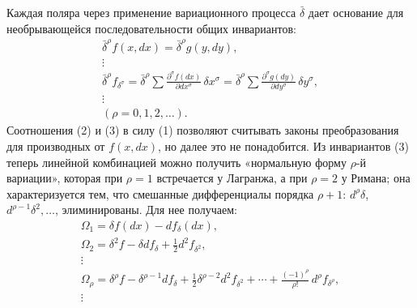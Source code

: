 \documentclass[11pt]{article}
\providecommand{\bdelta}{\bar{\delta}}
\begin{document}
Каждая поляра через применение вариационного процесса \(\bdelta\) дает основание для необрывающейся последовательности общих инвариантов:
\begin{equation}
\begin{gathered}
\bdelta^\rho f(x,dx)=\bdelta^\rho g(y,dy),\\
\vdots\\
\bdelta^\rho f_{\delta^\sigma}
=\bdelta^\rho\sum\frac{\partial^\sigma f(dx)}{\partial dx^\sigma}\,
\delta x^\sigma
=\bdelta^\rho\sum\frac{\partial^\sigma g(dy)}{\partial dy^\sigma}\,
\delta y^\sigma,\\
\vdots\\[0.2em]
(\rho=0,1,2,\ldots).
\end{gathered}
\tag{3}
\end{equation}
Соотношения (2) и (3) в силу (1) позволяют считывать законы преобразования для производных от \(f(x,dx)\), но далее это не понадобится. Из инвариантов (3) теперь линейной комбинацией можно получить «нормальную форму \(\rho\)-й вариации», которая при \(\rho=1\) встречается у Лагранжа, а при \(\rho=2\) у Римана; она характеризуется тем, что смешанные дифференциалы порядка \(\rho+1\): \(d^\rho\delta\), \(d^{\rho-1}\delta^2,\ldots\), элиминированы. Для нее получаем:
\begin{equation}
\begin{gathered}
\Omega_1=\delta f(dx)-d f_\delta(dx),\\
\Omega_2=\delta^2 f-\delta d f_\delta+\frac12 d^2 f_{\delta^2},\\
\vdots\\
\Omega_\rho=\delta^\rho f-\delta^{\rho-1}d f_\delta
+\frac12\delta^{\rho-2}d^2 f_{\delta^2}
+\cdots+\frac{(-1)^\rho}{\rho!}\,d^\rho f_{\delta^\rho},\\
\vdots
\end{gathered}
\tag{4}
\end{equation}
\end{document}
